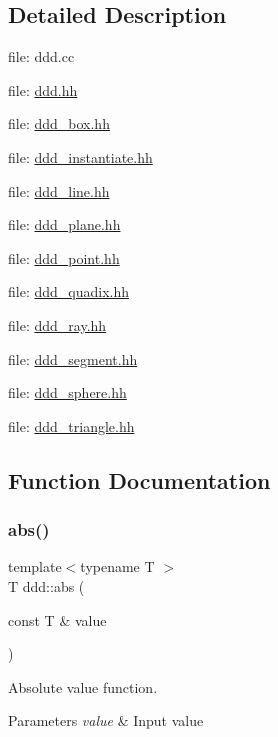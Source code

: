 \subsection{Detailed Description}
file\+: ddd.\+cc

file\+: \hyperlink{ddd_8hh_source}{ddd.\+hh}

file\+: \hyperlink{ddd__box_8hh_source}{ddd\+\_\+box.\+hh}

file\+: \hyperlink{ddd__instantiate_8hh_source}{ddd\+\_\+instantiate.\+hh}

file\+: \hyperlink{ddd__line_8hh_source}{ddd\+\_\+line.\+hh}

file\+: \hyperlink{ddd__plane_8hh_source}{ddd\+\_\+plane.\+hh}

file\+: \hyperlink{ddd__point_8hh_source}{ddd\+\_\+point.\+hh}

file\+: \hyperlink{ddd__quadix_8hh_source}{ddd\+\_\+quadix.\+hh}

file\+: \hyperlink{ddd__ray_8hh_source}{ddd\+\_\+ray.\+hh}

file\+: \hyperlink{ddd__segment_8hh_source}{ddd\+\_\+segment.\+hh}

file\+: \hyperlink{ddd__sphere_8hh_source}{ddd\+\_\+sphere.\+hh}

file\+: \hyperlink{ddd__triangle_8hh_source}{ddd\+\_\+triangle.\+hh} 

\subsection{Function Documentation}
\mbox{\label{namespaceddd_a9ac20d4240d0a9fa208e3dd220101a0a}} 
\subsubsection{\texorpdfstring{abs()}{abs()}}
{\footnotesize\ttfamily template$<$typename T $>$ \\
T ddd\+::abs (\begin{DoxyParamCaption}\item[{const T \&}]{value }\end{DoxyParamCaption})\hspace{0.3cm}{\ttfamily [inline]}}



Absolute value function. 


\begin{DoxyParams}{Parameters}
{\em value} & Input value \\
\hline
\end{DoxyParams}
\mbox{\label{namespaceddd_a03e440b351f44fec5abac1270231e3bb}} 
